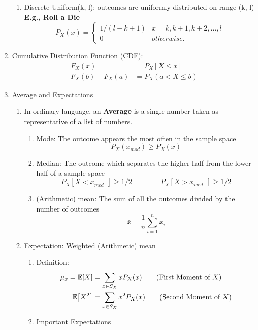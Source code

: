\begin{enumerate}
{\begin{enumerate}
{            }
            \item Discrete Uniform(k, l): outcomes are uniformly distributed on range (k, l) \textbf{E.g., Roll a Die}{
                \[ P_X(x) = 
                \begin{cases}
                    1/(l-k+1)   & x=k,k+1,k+2,\ldots,l \\
                    0   & otherwise.
                \end{cases} \]
            }            
        \end{enumerate}
    }
    \item Cumulative Distribution Function (CDF): {
        \begin{align*}
            F_X(x)&=P_X[X\leq x] \\
            F_X(b)-F_X(a)&=P_X(a<X\leq b)
        \end{align*}
    }
    \item Average and Expectations{
        \begin{enumerate}
            \item In ordinary language, an \textbf{Average} is a single number taken as representative of a list of numbers.{
            \begin{enumerate}
                \item Mode: The outcome appears the most often in the sample space \[P_X(x_{mod})\geq P_X(x)\]
                \item Median: The outcome which separates the higher half from  the lower half of a sample space \[P_X[X < x_{med^+}] \geq 1/2 \qquad \qquad P_X[X > x_{med^-}]\geq 1/2\]
                \item (Arithmetic) mean:  The sum of all the outcomes divided by the number of outcomes \[\bar{x} = \frac{1}{n}\sum_{i=1}^{n}x_i\]
            \end{enumerate}
            }
            \item Expectation: Weighted (Arithmetic) mean{
                \begin{enumerate}
                    \item Definition:{
                        \begin{align}
                            \mu_x = \E{X}&=\sum_{x\in S_X}xP_X(x) \tag{First Moment of $X$}\\
                            \E{X^2}&=\sum_{x\in S_X}x^2P_X(x) \tag{Second Moment of $X$}
                        \end{align}
                    }
                    \item Important Expectations{
}
\end{enumerate}}
\end{enumerate}}
\end{enumerate}
